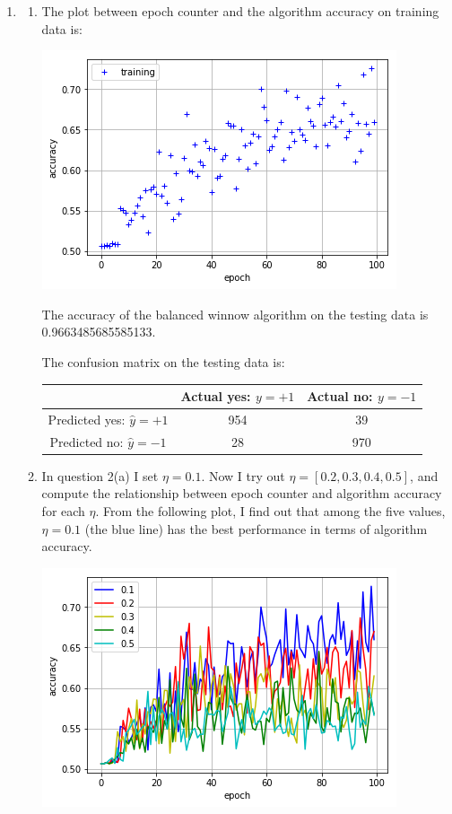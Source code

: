 \documentclass[paper=letter, fontsize=12pt]{article}
\begin{document}
\begin{enumerate}
\begin{enumerate}
\end{enumerate}

\item 
\begin{enumerate}
	\item 
	The plot between epoch counter and the algorithm accuracy on training data is:
	
	\includegraphics[scale=0.5]{p2q2a.png}
	
	The accuracy of the balanced winnow algorithm on the testing data is 0.9663485685585133.
	
	The confusion matrix on the testing data is:
	
	\begin{tabular} {|c|c|c|}
		\hline
		& Actual yes: $y = +1$ & Actual no: $y = -1$	\\ \hline
		Predicted yes: $\hat{y} = +1$& 954 & 39 \\ \hline
		Predicted no: $\hat{y} = -1$ & 28 & 970 \\ \hline
	\end{tabular}

	\item 
	In question 2(a) I set $\eta = 0.1$. Now I try out $\eta = [0.2, 0.3, 0.4, 0.5]$, and compute the relationship between epoch counter and algorithm accuracy for each $\eta$. From the following plot, I find out that among the five values, $\eta = 0.1$ (the blue line) has the best performance in terms of algorithm accuracy.
	
	\includegraphics[scale=0.5]{p2q2b1.png}
	

\end{enumerate}
\end{enumerate}
\end{document}
